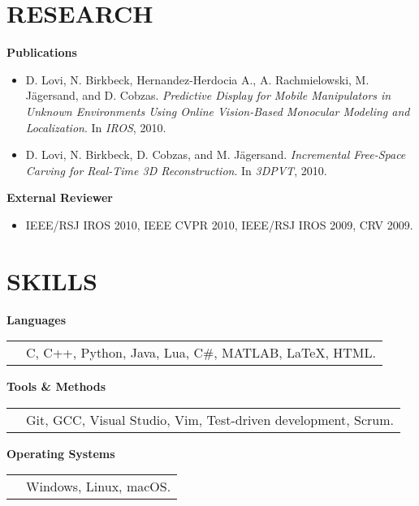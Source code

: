 \documentclass{res}
\begin{document}
\begin{resume}
\section{RESEARCH}
    \vspace*{0.75ex}
    \textbf{Publications}\vspace*{0.666ex}
    \begin{itemize}[label={}, labelsep=*, leftmargin=2.8em]
        \item D. Lovi, N. Birkbeck, Hernandez-Herdocia A., A. Rachmielowski, M. J{\"a}gersand, and D. \hspace*{1.5em}Cobzas.  \textit{Predictive Display for Mobile Manipulators in Unknown Environments Using \hspace*{1.5em}Online Vision-Based Monocular Modeling and Localization}. In \textit{IROS}, 2010.
        \item D. Lovi, N. Birkbeck, D. Cobzas, and M. J{\"a}gersand. \textit{Incremental Free-Space Carving for \hspace*{1.5em}Real-Time 3D Reconstruction}. In \textit{3DPVT}, 2010.
    \end{itemize}
    \textbf{External Reviewer}
    \begin{itemize}[label={}, labelsep=*, leftmargin=2.8em]
    \item IEEE/RSJ IROS 2010, IEEE CVPR 2010, IEEE/RSJ IROS 2009, CRV 2009.
    \end{itemize}


\section{SKILLS}
    \vspace*{0.5ex}
    \textbf{Languages}\\
    \begin{tabular}{ l L{5.5in} }
    \hspace*{1.2em} & C, C++, Python, Java, Lua, C\#, MATLAB, \LaTeX, HTML. \\
    \end{tabular}

    \textbf{Tools \& Methods}\\
    \begin{tabular}{ l L{5.5in} }
    \hspace*{1.2em} & Git, GCC, Visual Studio, Vim, Test-driven development, Scrum.\\
    \end{tabular}

    \textbf{Operating Systems}\\
    \begin{tabular}{ l L{5.5in} }
    \hspace*{1.2em} & Windows, Linux, macOS.\\
    \end{tabular}


\end{resume}
\end{document}
